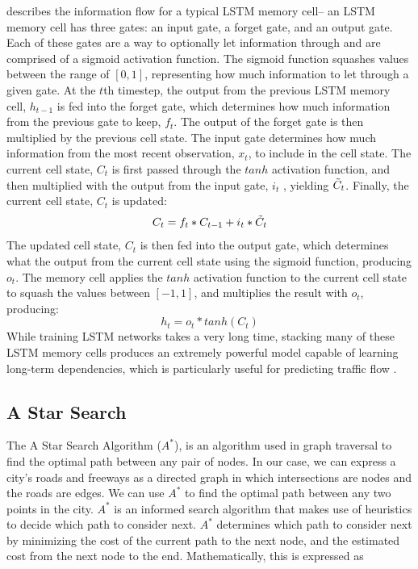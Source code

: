 \documentclass{article}
\begin{document}
\citep{lstm} describes the information flow for a typical LSTM memory cell-- an LSTM memory cell has three gates: an input gate, a forget gate, and an output gate. Each of these gates are a way to optionally let information through and are comprised of a sigmoid activation function. The sigmoid function squashes values between the range of $[0, 1]$, representing how much information to let through a given gate. At the $t$th timestep, the output from the previous LSTM memory cell, $h_{t-1}$ is fed into the forget gate, which determines how much information from the previous gate to keep, $f_{t}$. The output of the forget gate is then multiplied by the previous cell state. The input gate determines how much information from the most recent observation, $x_{t}$, to include in the cell state. The current cell state, $C_{t}$ is first passed through the $tanh$ activation function, and then multiplied with the output from the input gate, $i_{t}$ , yielding $\Tilde{C}_{t}$. Finally, the current cell state, $C_{t}$ is updated:
\begin{equation}
    C_{t} = f_{t}*C_{t-1} + i_{t}*\Tilde{C}_{t}
\end{equation}
The updated cell state, $C_{t}$ is then fed into the output gate, which determines what the output from the current cell state using the sigmoid function, producing $o_{t}$. The memory cell applies the $tanh$ activation function to the current cell state to squash the values between $[-1,1]$, and multiplies the result with $o_{t}$, producing:
\begin{equation}
    h_{t} = o_{t}*tanh(C_{t})
\end{equation}
While training LSTM networks takes a very long time, stacking many of these LSTM memory cells produces an extremely powerful model capable of learning long-term dependencies, which is particularly useful for predicting traffic flow \citep{xiaochus}. \subsection{A Star Search}
The A Star Search Algorithm ($A^{*}$), is an algorithm used in graph traversal to find the optimal path between any pair of nodes. In our case, we can express a city's roads and freeways as a directed graph in which intersections are nodes and the roads are edges. We can use $A^{*}$ to find the optimal path between any two points in the city. $A^{*}$ is an informed search algorithm that makes use of heuristics to decide which path to consider next. $A^{*}$ determines which path to consider next by minimizing the cost of the current path to the next node, and the estimated cost from the next node to the end. Mathematically, this is expressed as 
\end{document}
